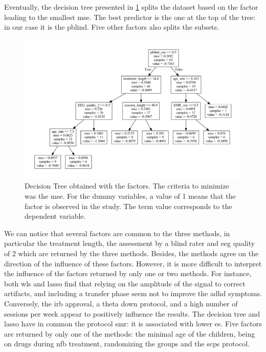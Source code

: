 Eventually, the decision tree presented in \cref{Figure:factors_analysis_decision_tree_results} splits the dataset based on the factor leading to the
smallest \gls{mse}. The best predictor is the one at the top of the tree: in our case it is the \gls{pblind}. Five other factors also splits the subsets. 

\begin{figure}[h!]
  \centering
  \includegraphics[width=1.0\linewidth]{figures/factors_analysis_decision_tree_results_no_colors_2-columns_fitting_image}
  \caption{Decision Tree obtained with the factors. The criteria to minimize was the \gls{mse}. For the dummy variables, a value of 1 means
	that the factor is observed in the study. The term value corresponds to the dependent variable.}
  \label{Figure:factors_analysis_decision_tree_results}
\end{figure}

We can notice that several factors are common to the three methods, in particular the treatment length, the assessment 
by a blind rater and \gls{eeg} quality of 2 which are returned by the three methods. Besides, 
the methods agree on the direction of the influence of these factors. However, it is more difficult to interpret the influence of the factors 
returned by only one or two methods. For instance, both \gls{wls} and \gls{lasso} find that  
relying on the amplitude of the signal to correct artifacts, and including a transfer phase seem not to improve the \gls{adhd} symptoms. 
Conversely, the \gls{irb} approval, a theta down protocol, and a high number of sessions per week appear to 
positively influence the results. The decision tree and \gls{lasso} have in common the protocol \gls{smr}: it is associated with lower \gls{es}.
Five factors are returned by only one of the methods: the minimal age of the children, being on drugs 
during \gls{nfb} treatment, randomizing the groups and the \glspl{scp} protocol. 



